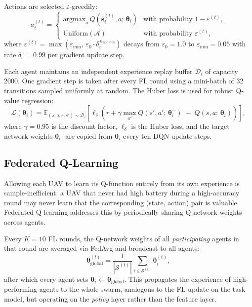 \documentclass[12pt,a4paper]{article}
\begin{document}
Actions are selected $\varepsilon$-greedily:
\begin{equation}
  a_i^{(t)} = \begin{cases}
    \mathrm{argmax}_{a}\, Q(\mathbf{s}_i^{(t)}, a;\, \boldsymbol{\theta}_i) &
      \text{with probability } 1 - \varepsilon^{(t)}, \\
    \mathrm{Uniform}(\mathcal{A}) & \text{with probability } \varepsilon^{(t)},
  \end{cases}
  \label{eq:eps_greedy}
\end{equation}
where $\varepsilon^{(t)} = \max\!\left(\varepsilon_{\min},\, \varepsilon_0 \cdot \delta_\varepsilon^{\,n_{\mathrm{updates}}}\right)$
decays from $\varepsilon_0 = 1.0$ to $\varepsilon_{\min} = 0.05$ with rate
$\delta_\varepsilon = 0.99$ per gradient update step.

Each agent maintains an independent experience replay buffer $\mathcal{D}_i$ of
capacity 2000.  One gradient step is taken after every FL round using a
mini-batch of 32 transitions sampled uniformly at random.  The Huber loss is used
for robust Q-value regression:
\begin{equation}
  \mathcal{L}(\boldsymbol{\theta}_i) = \mathbb{E}_{(s, a, r, s') \sim \mathcal{D}_i}
  \left[ \ell_{\delta}\!\left(
    r + \gamma \max_{a'} Q(s', a';\, \boldsymbol{\theta}_i^-)
    \;-\; Q(s, a;\, \boldsymbol{\theta}_i)
  \right) \right],
  \label{eq:huber}
\end{equation}
where $\gamma = 0.95$ is the discount factor, $\ell_\delta$ is the Huber loss,
and the target network weights $\boldsymbol{\theta}_i^-$ are copied from
$\boldsymbol{\theta}_i$ every ten DQN update steps.

\subsection{Federated Q-Learning}

Allowing each UAV to learn its Q-function entirely from its own experience is
sample-inefficient: a UAV that never had high battery during a high-accuracy round
may never learn that the corresponding (state, action) pair is valuable.
Federated Q-learning addresses this by periodically sharing
Q-network weights across agents.

Every $K = 10$ FL rounds, the Q-network weights of all \emph{participating}
agents in that round are averaged via FedAvg and broadcast to all agents:
\begin{equation}
  \boldsymbol{\theta}_{\mathrm{global}}^{(t)} =
  \frac{1}{|\mathcal{S}^{(t)}|}
  \sum_{i \in \mathcal{S}^{(t)}} \boldsymbol{\theta}_i^{(t)},
  \label{eq:fedQ}
\end{equation}
after which every agent sets $\boldsymbol{\theta}_i \leftarrow \boldsymbol{\theta}_{\mathrm{global}}$.
This propagates the experience of high-performing agents to the whole swarm,
analogous to the FL update on the task model, but operating on the
\emph{policy} layer rather than the feature layer.
\end{document}
